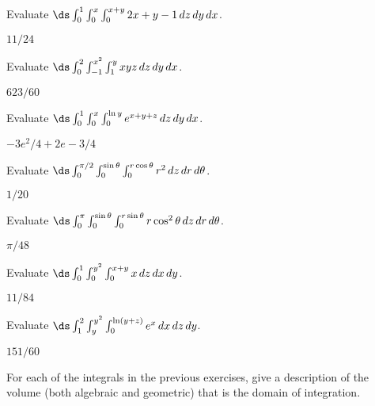 \begin{exercises}

\begin{exercise} Evaluate $\ds\int_{0}^{1}\int_{0}^{x}\int_{0}^{x+y}
2x+y-1 \,dz\,dy\,dx$.
\begin{answer} $11/24$
\end{answer}\end{exercise}

\begin{exercise} Evaluate $\ds\int_{0}^{2}\int_{-1}^{x^2}\int_{1}^{y}
xyz \,dz\,dy\,dx$.
\begin{answer} $623/60$
\end{answer}\end{exercise}

\begin{exercise} Evaluate $\ds\int_{0}^{1}\int_{0}^{x}\int_{0}^{\ln y}
e^{x+y+z}\,dz\,dy\,dx$.
\begin{answer} $-3e^2/4+2e-3/4$
\end{answer}\end{exercise}

\begin{exercise} Evaluate
$\ds\int_{0}^{\pi/2}\int_{0}^{\sin\theta}\int_{0}^{r\cos\theta}
r^2\,dz\,dr\,d\theta$.
\begin{answer} $1/20$
\end{answer}\end{exercise}

\begin{exercise} Evaluate 
$\ds\int_{0}^{\pi}\int_{0}^{\sin\theta}\int_{0}^{r\sin\theta}
r\cos^2\theta\,dz\,dr\,d\theta$.
\begin{answer} $\pi/48$
\end{answer}\end{exercise}

\begin{exercise} Evaluate $\ds\int_{0}^{1}\int_{0}^{y^2}\int_{0}^{x+y}
x\,dz\,dx\,dy$.
\begin{answer} $11/84$
\end{answer}\end{exercise}

\begin{exercise} Evaluate $\ds\int_{1}^{2}\int_{y}^{y^2}\int_{0}^{\ln(y+z)}
e^x\,dx\,dz\,dy$.
\begin{answer} $151/60$
\end{answer}\end{exercise}

\begin{exercise} For each of the integrals in the previous exercises, give a
description of the volume (both algebraic and geometric) that is the
domain of integration.



\end{exercise}
\end{exercises}
